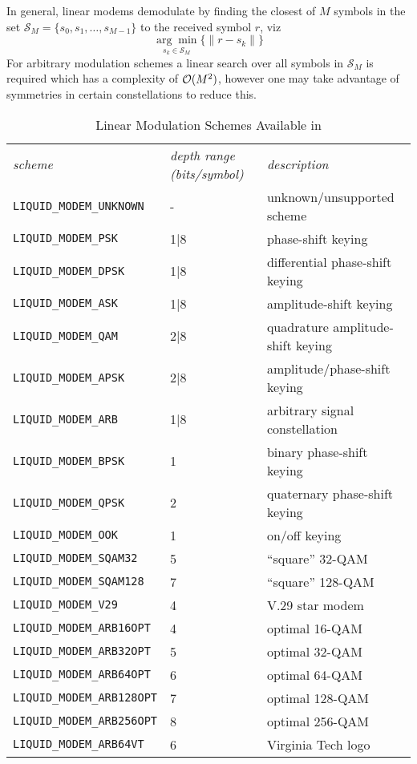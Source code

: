 In general, linear modems demodulate by finding the closest of $M$
symbols in the set $\mathcal{S}_M = \{s_0,s_1,\ldots,s_{M-1}\}$ 
to the received symbol $r$, viz
%
\begin{equation}
\label{eqn:modem:demod}
    \underset{s_k \in \mathcal{S}_M}{\arg\min}
    \bigl\{
        \| r - s_k \|
    \bigr\}
\end{equation}
%
For arbitrary modulation schemes a linear search over all symbols in
$\mathcal{S}_M$ is required which has a complexity of $\mathcal{O}(M^2)$, however one may
take advantage of symmetries in certain constellations to reduce this.

\begin{table*}
\caption{Linear Modulation Schemes Available in \liquid}
\label{tab:modem:schemes}
\centering
{\small
\begin{tabular*}{0.95\textwidth}{l@{\extracolsep{\fill}}ll}
\toprule
{\it scheme} &
{\it depth range (bits/symbol)} &
{\it description}\\\otoprule
%
{\tt LIQUID\_MODEM\_UNKNOWN}    & -     & unknown/unsupported scheme\\
{\tt LIQUID\_MODEM\_PSK}        & 1|8   & phase-shift keying\\
{\tt LIQUID\_MODEM\_DPSK}       & 1|8   & differential phase-shift keying\\
{\tt LIQUID\_MODEM\_ASK}        & 1|8   & amplitude-shift keying\\
{\tt LIQUID\_MODEM\_QAM}        & 2|8   & quadrature amplitude-shift keying\\
{\tt LIQUID\_MODEM\_APSK}       & 2|8   & amplitude/phase-shift keying\\
{\tt LIQUID\_MODEM\_ARB}        & 1|8   & arbitrary signal constellation\\\midrule
%
{\tt LIQUID\_MODEM\_BPSK}       & 1     & binary phase-shift keying\\
{\tt LIQUID\_MODEM\_QPSK}       & 2     & quaternary phase-shift keying\\
{\tt LIQUID\_MODEM\_OOK}        & 1     & on/off keying\\
{\tt LIQUID\_MODEM\_SQAM32}     & 5     & ``square'' 32-QAM\\
{\tt LIQUID\_MODEM\_SQAM128}    & 7     & ``square'' 128-QAM\\
{\tt LIQUID\_MODEM\_V29}        & 4     & V.29 star modem\\
{\tt LIQUID\_MODEM\_ARB16OPT}   & 4     & optimal 16-QAM\\
{\tt LIQUID\_MODEM\_ARB32OPT}   & 5     & optimal 32-QAM\\
{\tt LIQUID\_MODEM\_ARB64OPT}   & 6     & optimal 64-QAM\\
{\tt LIQUID\_MODEM\_ARB128OPT}  & 7     & optimal 128-QAM\\
{\tt LIQUID\_MODEM\_ARB256OPT}  & 8     & optimal 256-QAM\\
{\tt LIQUID\_MODEM\_ARB64VT}    & 6     & Virginia Tech logo\\\bottomrule
% 
\end{tabular*}
}
\end{table*}%
